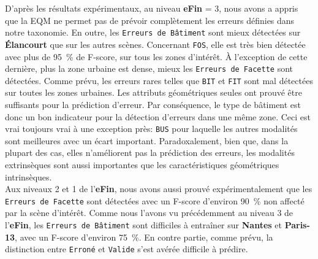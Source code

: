         D'après les résultats expérimentaux, au niveau \textbf{eFin} = 3, nous avons a appris que la EQM ne permet pas de prévoir complètement les erreurs définies dans notre taxonomie.
        En outre, les \texttt{Erreurs de Bâtiment} sont mieux détectées sur \textbf{\'Elancourt} que sur les autres scènes.
        Concernant \texttt{FOS}, elle est très bien détectée avec plus de \SI[locale=FR]{95}{\percent} de F-score, sur tous les zones d'intérêt.
        \`A l'exception de cette dernière, plus la zone urbaine est dense, mieux les \texttt{Erreurs de Facette} sont détectées.
        Comme prévu, les erreurs rares telles que \texttt{BIT} et \texttt{FIT} sont mal détectées sur toutes les zones urbaines.
        Les attributs géométriques seules ont prouvé être suffisants pour la prédiction d'erreur.
        Par conséquence, le type de bâtiment est donc un bon indicateur pour la détection d'erreurs dans une même zone.
        Ceci est vrai toujours vrai à une exception près: \texttt{BUS} pour laquelle les autres modalités sont meilleures avec un écart important.
        Paradoxalement, bien que, dans la plupart des cas, elles n'améliorent pas la prédiction des erreurs, les modalités extrinsèques sont aussi importantes que les caractéristiques géométriques intrinsèques.\\

        Aux niveaux 2 et 1 de l'\textbf{eFin}, nous avons aussi prouvé expérimentalement que les \texttt{Erreurs de Facette} sont détectées avec un F-score d'environ \SI[locale=FR]{90}{\percent} non affecté par la scène d'intérêt.
        Comme nous l'avons vu précédemment au niveau 3 de l'\textbf{eFin}, les \texttt{Erreurs de Bâtiment} sont difficiles à entraîner sur \textbf{Nantes} et \textbf{Paris-13}, avec un F-score d'environ \SI[locale=FR]{75}{\percent}.
        En contre partie, comme prévu, la distinction entre \texttt{Erroné} et \texttt{Valide} s'est avérée difficile à prédire.

